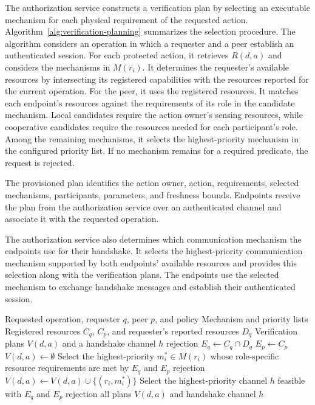 \documentclass[sigconf,authordraft]{acmart}
\begin{document}
The authorization service constructs a verification plan by selecting an executable mechanism for each physical requirement of the requested action.
Algorithm~\ref{alg:verification-planning} summarizes the selection procedure.
The algorithm considers an operation in which a requester and a peer establish an authenticated session.
For each protected action, it retrieves $R(d,a)$ and considers the mechanisms in $M(r_i)$.
It determines the requester's available resources by intersecting its registered capabilities with the resources reported for the current operation.
For the peer, it uses the registered resources.
It matches each endpoint's resources against the requirements of its role in the candidate mechanism.
Local candidates require the action owner's sensing resources, while cooperative candidates require the resources needed for each participant's role.
Among the remaining mechanisms, it selects the highest-priority mechanism in the configured priority list.
If no mechanism remains for a required predicate, the request is rejected.

The provisioned plan identifies the action owner, action, requirements, selected mechanisms, participants, parameters, and freshness bounds.
Endpoints receive the plan from the authorization service over an authenticated channel and associate it with the requested operation.

The authorization service also determines which communication mechanism the endpoints use for their handshake.
It selects the highest-priority communication mechanism supported by both endpoints' available resources and provides this selection along with the verification plans.
The endpoints use the selected mechanism to exchange handshake messages and establish their authenticated session.


\begin{algorithm}[t]
\caption{Verification Plan and Handshake Channel Selection}
\label{alg:verification-planning}
\begin{algorithmic}[1]
\Require Requested operation, requester $q$, peer $p$, and policy
\Require Mechanism and priority lists
\Require Registered resources $C_q$, $C_p$, and requester's reported resources $D_q$
\Ensure Verification plans $V(d,a)$ and a handshake channel $h$
    \State \Return rejection
\EndIf
\State $E_q \gets C_q \cap D_q$ 
\State $E_p \gets C_p$ 
    \State $V(d,a) \gets \emptyset$
        \State Select the highest-priority $m_i^* \in M(r_i)$ whose role-specific resource requirements are met by $E_q$ and $E_p$
            \State \Return rejection
        \EndIf
        \State $V(d,a) \gets V(d,a) \cup \{(r_i,m_i^*)\}$
    \EndFor
\EndFor
\State Select the highest-priority channel $h$ feasible with $E_q$ and $E_p$
    \State \Return rejection
\EndIf
\State \Return all plans $V(d,a)$ and handshake channel $h$
\end{algorithmic}
\end{algorithm}
\end{document}

